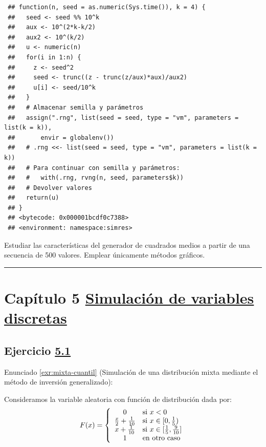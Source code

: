 \documentclass[
  10pt,
]{book}
\theoremstyle{break}
\theoremstyle{nonumberplain}
\begin{document}
\begin{verbatim}
 ## function(n, seed = as.numeric(Sys.time()), k = 4) {
 ##   seed <- seed %% 10^k
 ##   aux <- 10^(2*k-k/2)
 ##   aux2 <- 10^(k/2)
 ##   u <- numeric(n)
 ##   for(i in 1:n) {
 ##     z <- seed^2
 ##     seed <- trunc((z - trunc(z/aux)*aux)/aux2)
 ##     u[i] <- seed/10^k
 ##   }
 ##   # Almacenar semilla y parámetros
 ##   assign(".rng", list(seed = seed, type = "vm", parameters = list(k = k)),
 ##       envir = globalenv())
 ##   # .rng <<- list(seed = seed, type = "vm", parameters = list(k = k))
 ##   # Para continuar con semilla y parámetros:
 ##   #   with(.rng, rvng(n, seed, parameters$k))
 ##   # Devolver valores
 ##   return(u)
 ## }
 ## <bytecode: 0x000001bcdf0c7388>
 ## <environment: namespace:simres>
\end{verbatim}

Estudiar las características del generador de cuadrados medios a partir de una secuencia de 500 valores.
Emplear únicamente métodos gráficos.

\begin{center}\rule{0.5\linewidth}{0.5pt}\end{center}

\hypertarget{capuxedtulo-5-simulaciuxf3n-de-variables-discretas}{%
\section{\texorpdfstring{Capítulo 5 \href{discretas.html}{Simulación de variables discretas}}{Capítulo 5 Simulación de variables discretas}}\label{capuxedtulo-5-simulaciuxf3n-de-variables-discretas}}

\hypertarget{sol-mixta-cuantil}{%
\subsection{\texorpdfstring{Ejercicio \href{ejercicios-discretas.html\#exr:mixta-cuantil}{5.1}}{Ejercicio 5.1}}\label{sol-mixta-cuantil}}

Enunciado \ref{exr:mixta-cuantil} (Simulación de una distribución mixta mediante el método de inversión generalizado):

Consideramos la variable aleatoria con función de distribución dada por:
\[F(x)=\left\{
\begin{array}
[c]{cl}0 & \mbox{si $x<0$}\\
\frac{x}{2}+\frac{1}{10} & \mbox{si $x\in[0,\frac{1}{5})$}\\
x+\frac{1}{10} & \mbox{si $x\in[\frac{1}{5},\frac{9}{10}]$}\\
1 & \mbox{en otro caso}
\end{array}
\right.\]
\end{document}
